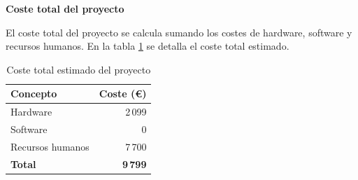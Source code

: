 \textbf{Coste total del proyecto}

El coste total del proyecto se calcula sumando los costes de hardware, software y recursos humanos. En la tabla \ref{tab:coste-total} se detalla el coste total estimado.

\begin{table}[!ht]
      \centering
      \begin{tabular}{|l|r|}
            \hline
            \textbf{Concepto} & \textbf{Coste (€)} \\
            \hline
            Hardware          & 2\,099             \\
            Software          & 0                  \\
            Recursos humanos  & 7\,700             \\
            \hline
            \textbf{Total}    & \textbf{9\,799}    \\
            \hline
      \end{tabular}
      \caption{Coste total estimado del proyecto}
      \label{tab:coste-total}
\end{table}